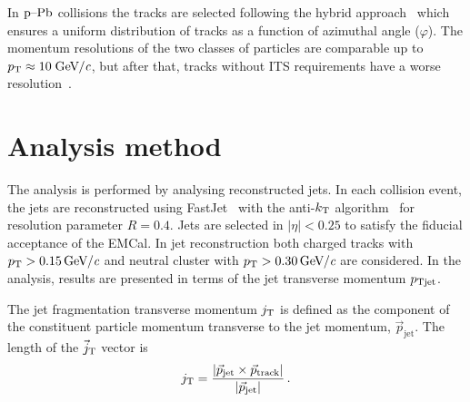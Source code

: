 In $\mbox{p--Pb}$ collisions the tracks are selected following the hybrid approach~\cite{hybridExplanation} which ensures a uniform distribution of tracks as a function of azimuthal angle ($\varphi$). The momentum resolutions of the two classes of particles are comparable up to $p_{\rm T} \approx 10\;\mathrm{GeV}\kern-0.05em/\kern-0.02em \textit{c}$, but after that, tracks without ITS requirements have a worse resolution~\cite{alicePerformance,aliceBackgroundFluctuation}.

\section{Analysis method}
\label{sec:methods}

The analysis is performed by analysing reconstructed jets. In each collision event, the jets are reconstructed using FastJet~\cite{fastjet} with the anti-$k_{\rm T}$ algorithm~\cite{antikt} for resolution parameter $R=0.4$. Jets are selected in $\left| \eta \right| < 0.25 $ to satisfy the fiducial acceptance of the EMCal. In jet reconstruction both charged tracks with $\pt{}>\unit[0.15]{\GeVc}$ and neutral cluster with $\pt{}>\unit[0.30]{\GeVc}$ are considered. In the analysis, results are presented in terms of the jet transverse momentum $p_{\rm Tjet}$.

The jet fragmentation transverse momentum $j_{\rm T}$ is defined as the component of the constituent particle momentum transverse to the jet momentum, $\vec{p}_{\mathrm{jet}}$.
The length of the $\vec{j}_{\rm T}$ vector is
  \begin{equation}
    j_{\rm T} = \frac{|\vec{p}_{\mathrm{jet}} \times \vec{p}_{\mathrm{track}}|}{|\vec{p}_{\mathrm{jet}}|} \,.
  \label{eq:jtdefinition}
  \end{equation}

